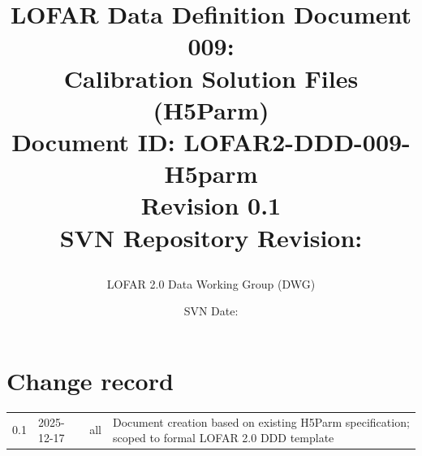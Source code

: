 \documentclass[a4paper,10pt,bibtotoc]{scrartcl}
\begin{document}

\title{LOFAR Data Definition Document 009: \\ Calibration Solution Files (H5Parm) \\
{\normalsize Document ID: LOFAR2-DDD-009-H5parm} \\
{\normalsize Revision 0.1} \\
{\normalsize SVN Repository Revision: \svnInfoRevision} \\
\author{LOFAR 2.0 Data Working Group (DWG)}
\date{\small{SVN Date: \svnInfoDate}}}
\maketitle

\tableofcontents

\clearpage


\section*{Change record}

\begin{center}
  \tablelasttail{\hline}
  \begin{supertabular}{lllp{10cm}}
    0.1 & 2025-12-17 & all & Document creation based on existing H5Parm specification; scoped to formal LOFAR 2.0 DDD template \\
  \end{supertabular}
\end{center}

\end{document}
